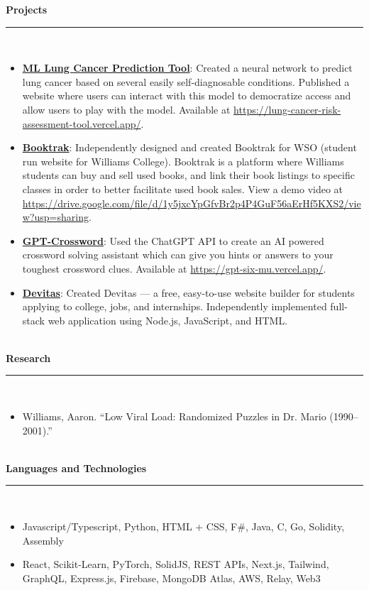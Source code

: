 \documentclass[9pt]{extarticle}
\begin{document}
\textbf{Projects}\\[-2ex]
\rule{\textwidth}{0.4pt}\\ 
\vspace{-\baselineskip}
\begin{itemize}[itemsep=0pt, topsep=0pt]
\item \textbf{\underline{ML Lung Cancer Prediction Tool}}: Created a neural network to predict lung cancer based on several easily self-diagnosable conditions. Published a website where users can interact with this model to democratize access and allow users to play with the model. Available at \url{https://lung-cancer-risk-assessment-tool.vercel.app/}.
\item \textbf{\underline{Booktrak}}: Independently designed and created Booktrak for WSO (student run website for Williams College). Booktrak is a platform where Williams students can buy and sell used books, and link their book listings to specific classes in order to better facilitate used book sales. View a demo video at \url{https://drive.google.com/file/d/1y5jxcYpGfvBr2p4P4GuF56aErHf5KXS2/view?usp=sharing}.
\item \textbf{\underline{GPT-Crossword}}: Used the ChatGPT API to create an AI powered crossword solving assistant which can give you hints or answers to your toughest crossword clues. Available at \url{https://gpt-six-mu.vercel.app/}.
\item \textbf{\underline{Devitas}}: Created Devitas — a free, easy-to-use website builder for students applying to college, jobs, and internships. Independently implemented full-stack web application using Node.js, JavaScript, and HTML.
\end{itemize}~\\[-1ex]
\textbf{Research}\\[-2ex]
\rule{\textwidth}{0.4pt}\\ 
\vspace{-\baselineskip}
\begin{itemize}[itemsep=0pt, topsep=0pt]
\item Williams, Aaron. “Low Viral Load: Randomized Puzzles in Dr. Mario (1990–2001).”
\end{itemize}~\\[-1ex]
\textbf{Languages and Technologies}\\[-2ex]
\rule{\textwidth}{0.4pt}\\ 
\vspace{-\baselineskip}
\begin{itemize}[itemsep=0pt, topsep=0pt]
\item Javascript/Typescript, Python, HTML + CSS, F\#, Java, C, Go, Solidity, Assembly
\item React, Scikit-Learn, PyTorch, SolidJS, REST APIs, Next.js, Tailwind, GraphQL, Express.js, Firebase, MongoDB Atlas, AWS, Relay, Web3
\end{itemize}
\end{document}
